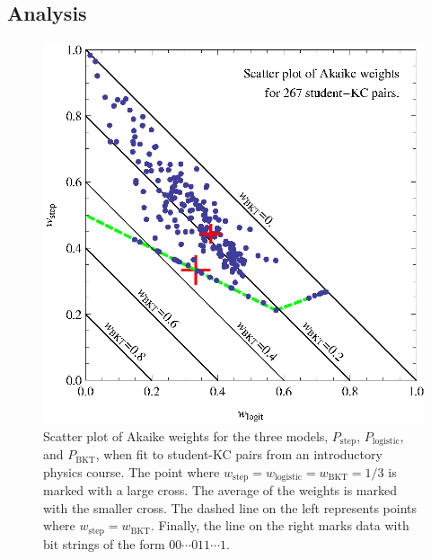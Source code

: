 \documentclass{acmlarge-edm}
\begin{document}
\subsection{Analysis}

\begin{figure}
  \centering \includegraphics{scatter-weights.eps}
  \caption{Scatter plot of  Akaike weights for the three models, 
   $P_\mathrm{step}$, $P_\mathrm{logistic}$, and $P_\mathrm{BKT}$, 
   when fit to student-KC pairs from an introductory physics course.
   The point where
   $w_\mathrm{step}=w_\mathrm{logistic}=w_\mathrm{BKT}=1/3$ is
   marked with a  large cross.  The average of the  weights is marked with
   the smaller cross.
  The dashed line on the left represents points
   where $w_\mathrm{step}=w_\mathrm{BKT}$.  Finally, the line on 
   the right marks data with bit strings of the form
   $00\cdots 011\cdots 1$.} 
   \label{scatter1}
\end{figure}
\end{document}
